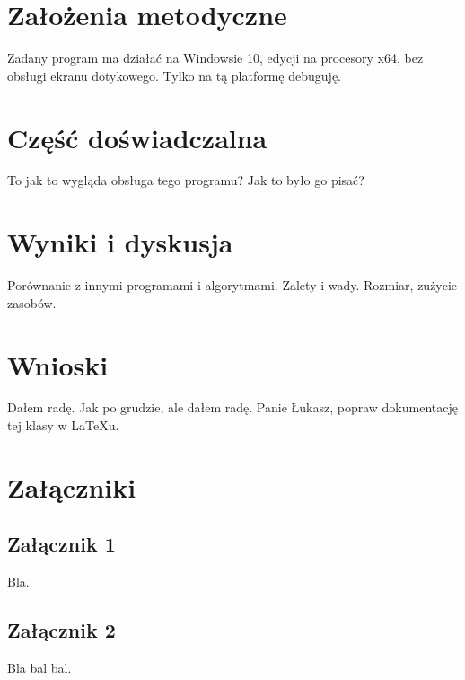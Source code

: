 \documentclass{SGGW-thesis}
\begin{document}
\chapter{Założenia metodyczne}
Zadany program ma działać na Windowsie 10, edycji na procesory x64, bez obsługi ekranu dotykowego. Tylko na tą platformę debuguję.

\chapter{Część doświadczalna}
To jak to wygląda obsługa tego programu? Jak to było go pisać?

\chapter{Wyniki i dyskusja}
Porównanie z innymi programami i algorytmami. Zalety i wady. Rozmiar, zużycie zasobów.

\chapter{Wnioski}
Dałem radę. Jak po grudzie, ale dałem radę.
Panie Łukasz, popraw dokumentację tej klasy w LaTeXu.

\chapter{Załączniki}
\section{Załącznik 1}
Bla.

\section{Załącznik 2}
Bla bal bal.



\beforelastpage[2025]
\end{document}
